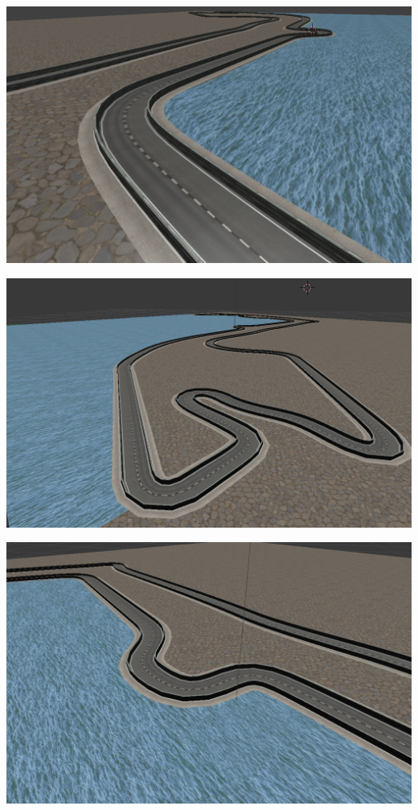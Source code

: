 \documentclass[notes,slidesec,a4]{seminar}
\begin{document}
\begin{hslide}
	\begin{minipage}{0.5\textwidth}
		\includegraphics[width=\textwidth]{MonacoPlano3.png}
	\end{minipage}
	\begin{minipage}{0.515\textwidth}
		\includegraphics[width=\textwidth]{MonacoPlano9.png}
	\end{minipage}
	\begin{minipage}{0.5\textwidth}
		\includegraphics[width=\textwidth]{MonacoPlano10.png}

\end{minipage}
\end{hslide}
\end{document}
